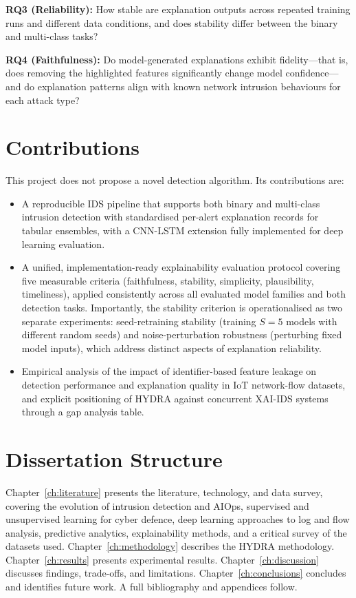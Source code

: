 \documentclass[12pt,a4paper]{report}
\begin{document}
\noindent\textbf{RQ3 (Reliability):} How stable are explanation outputs across repeated training runs and different data conditions, and does stability differ between the binary and multi-class tasks?

\noindent\textbf{RQ4 (Faithfulness):} Do model-generated explanations exhibit fidelity---that is, does removing the highlighted features significantly change model confidence---and do explanation patterns align with known network intrusion behaviours for each attack type?

\section{Contributions}
\label{sec:contributions}

This project does not propose a novel detection algorithm. Its contributions are:
\begin{itemize}
  \item A reproducible IDS pipeline that supports both binary and multi-class intrusion detection with standardised per-alert explanation records for tabular ensembles, with a CNN-LSTM extension fully implemented for deep learning evaluation.
  \item A unified, implementation-ready explainability evaluation protocol covering five measurable criteria (faithfulness, stability, simplicity, plausibility, timeliness), applied consistently across all evaluated model families and both detection tasks. Importantly, the stability criterion is operationalised as two separate experiments: seed-retraining stability (training $S = 5$ models with different random seeds) and noise-perturbation robustness (perturbing fixed model inputs), which address distinct aspects of explanation reliability.
  \item Empirical analysis of the impact of identifier-based feature leakage on detection performance and explanation quality in IoT network-flow datasets, and explicit positioning of HYDRA against concurrent XAI-IDS systems through a gap analysis table.
\end{itemize}

\section{Dissertation Structure}
\label{sec:structure}

Chapter~\ref{ch:literature} presents the literature, technology, and data survey, covering the evolution of intrusion detection and AIOps, supervised and unsupervised learning for cyber defence, deep learning approaches to log and flow analysis, predictive analytics, explainability methods, and a critical survey of the datasets used. Chapter~\ref{ch:methodology} describes the HYDRA methodology. Chapter~\ref{ch:results} presents experimental results. Chapter~\ref{ch:discussion} discusses findings, trade-offs, and limitations. Chapter~\ref{ch:conclusions} concludes and identifies future work. A full bibliography and appendices follow.
\end{document}
